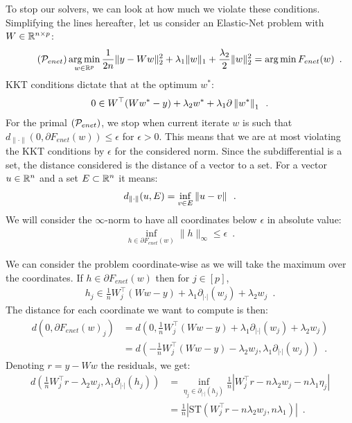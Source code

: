 \documentclass[../main.tex]{subfiles}
\begin{document}
To stop our solvers, we can look at how much we violate these conditions.
Simplifying the lines hereafter, let us consider an Elastic-Net problem
with $W\in\mathbb{R}^{n\times p}$:
\begin{align}\tag{$\mathcal{P}_{enet}$}
	\argmin_{w\in\bbR^p}
	\frac{1}{2n} \|y - Ww\|^2_2 + \lambda_1 \|w\|_1 +
	\frac{\lambda_2}{2}\|w\|^2_2 = \argmin F_{enet}(w)
	\enspace.
\end{align}
KKT conditions dictate that at the optimum $w^*$:
\begin{align*}
	0 \in W^\top (Ww^* - y) + \lambda_2 w^* + \lambda_1 \partial\left \lVert w^* \right \rVert_1
	\enspace.
\end{align*}
For the primal $(\mathcal{P}_{enet})$, we stop when current iterate $w$ is such that
$d_{\|\cdot\|}(0, \partial F_{enet}(w))\leq \epsilon$ for $\epsilon > 0$.
This means that we are at most violating the KKT conditions by $\epsilon$ for the
considered norm.
Since the subdifferential is a set, the distance considered is the distance of
a vector to a set.
For a vector $u\in\mathbb{R}^n$ and a set $E\subset \mathbb{R}^n$ it means:
\begin{align*}
	d_{\left \lVert \cdot \right \rVert}(u, E) = \inf_{v\in E}\left \lVert u-v \right \rVert\enspace.
\end{align*}
We will consider the $\infty$-norm to have all coordinates below $\epsilon$
in absolute value:
\begin{align}\label{eq:eps_kkt}
	\inf_{h\in \partial F_{enet}(w)} \|h\|_\infty\leq\epsilon\enspace.
\end{align}

We can consider the problem coordinate-wise as we will take the maximum over
the coordinates.
If $h\in\partial F_{enet}(w)$ then for $j\in [p]$,
\begin{align*}
	h_j \in \frac{1}{n} W_j^\top (W w - y) +
	\lambda_1 \partial_{|\cdot |}(w_j) + \lambda_2 w_j
	\enspace.
\end{align*}
The distance for each coordinate we want to compute is then:
\begin{align*}
	d(0, \partial F_{enet}(w)_j)
	&=
		d\left(0, \frac{1}{n}W_j^\top (Ww-y) +
		 \lambda_1\partial_{|\cdot |}(w_j)+\lambda_2w_j\right) \\
	&=
		d\left(-\frac{1}{n}W_j^\top(Ww-y) - \lambda_2w_j,
		\lambda_1\partial_{|\cdot |}(w_j)\right)\enspace.
\end{align*}
Denoting $r=y - Ww$ the residuals, we get:
\begin{align}
		d\left(\frac{1}{n} W_j^\top r - \lambda_2 w_j,
			\lambda_1\partial_{|\cdot|}(h_j) \right)
			&= \inf_{\eta_j \in \partial_{|\cdot|}(h_j)}
			\frac{1}{n} \left| W_j^\top r-n \lambda_2 w_j
				- n \lambda_1 \eta_j\right|
				\nonumber\\
			&= \frac{1}{n} \left| \mathrm{ST}\left( W_j^\top r - n \lambda_2 w_j
				,n\lambda_1 \right) \right| \enspace.  \label{eq:stop_coord}
\end{align}
\end{document}
